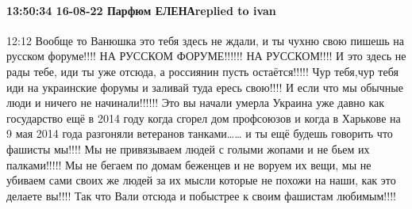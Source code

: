  
 
 
 
 

\paragraph{13:50:34 16-08-22 Парфюм ЕЛЕНАreplied to ivan}

12:12
Вообще то Ванюшка это тебя здесь не ждали, и ты чухню свою пишешь на русском
форуме!!!! НА РУССКОМ ФОРУМЕ!!!!!! НА РУССКОМ!!!! И это здесь не рады тебе, иди
ты уже отсюда, а россиянин пусть остаётся!!!!! Чур тебя,чур тебя иди на
украинские форумы и заливай туда ересь свою!!!! И если что мы обычные люди и
ничего не начинали!!!!!! Это вы начали умерла Украина уже давно как государство
ещё в 2014 году когда сгорел дом профсоюзов и когда в Харькове на 9 мая 2014
года разгоняли ветеранов танками…… и ты ещё будешь говорить что фашисты мы!!!!
Мы не привязываем людей с голыми жопами и не бьем их палками!!!!! Мы не бегаем
по домам беженцев и не воруем их вещи, мы не убиваем сами своих же людей за их
мысли которые не похожи на наши, как это делаете вы!!!! Так что Вали отсюда и
побыстрее к своим фашистам любимым!!!!

